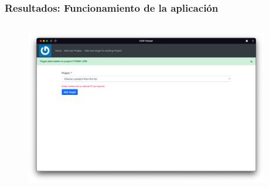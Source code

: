 \begin{frame}[plain,label=demo]
    \frametitle{Resultados: Funcionamiento de la aplicación}
    \begin{columns}
        \begin{column}{0.5\textwidth}
            \begin{figure}[H]
                \includegraphics[width=\textwidth]{include/app_images/target_added.png}
            \end{figure}
        \end{column}
        \begin{column}{0.5\textwidth}
            \tiny
            
            
        \end{column}
    \end{columns}
    
\end{frame}
